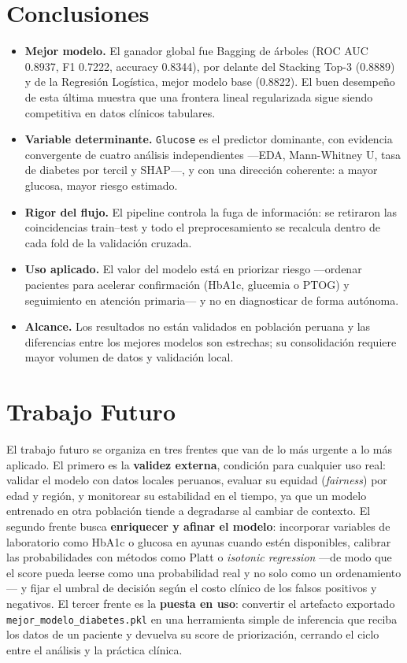 \documentclass[conference]{IEEEtran}
\newcommand{\code}[1]{\texttt{#1}}
\begin{document}
\section{Conclusiones}

\begin{itemize}[leftmargin=1.3em,itemsep=2pt]
  \item \textbf{Mejor modelo.} El ganador global fue Bagging de árboles (ROC AUC 0.8937, F1 0.7222, accuracy 0.8344), por delante del Stacking Top-3 (0.8889) y de la Regresión Logística, mejor modelo base (0.8822). El buen desempeño de esta última muestra que una frontera lineal regularizada sigue siendo competitiva en datos clínicos tabulares.
  \item \textbf{Variable determinante.} \code{Glucose} es el predictor dominante, con evidencia convergente de cuatro análisis independientes ---EDA, Mann-Whitney U, tasa de diabetes por tercil y SHAP---, y con una dirección coherente: a mayor glucosa, mayor riesgo estimado.
  \item \textbf{Rigor del flujo.} El pipeline controla la fuga de información: se retiraron las coincidencias train--test y todo el preprocesamiento se recalcula dentro de cada fold de la validación cruzada.
  \item \textbf{Uso aplicado.} El valor del modelo está en priorizar riesgo ---ordenar pacientes para acelerar confirmación (HbA1c, glucemia o PTOG) y seguimiento en atención primaria--- y no en diagnosticar de forma autónoma.
  \item \textbf{Alcance.} Los resultados no están validados en población peruana y las diferencias entre los mejores modelos son estrechas; su consolidación requiere mayor volumen de datos y validación local.
\end{itemize}

\section{Trabajo Futuro}

El trabajo futuro se organiza en tres frentes que van de lo más urgente a lo más aplicado. El primero es la \textbf{validez externa}, condición para cualquier uso real: validar el modelo con datos locales peruanos, evaluar su equidad (\emph{fairness}) por edad y región, y monitorear su estabilidad en el tiempo, ya que un modelo entrenado en otra población tiende a degradarse al cambiar de contexto. El segundo frente busca \textbf{enriquecer y afinar el modelo}: incorporar variables de laboratorio como HbA1c o glucosa en ayunas cuando estén disponibles, calibrar las probabilidades con métodos como Platt o \emph{isotonic regression} ---de modo que el score pueda leerse como una probabilidad real y no solo como un ordenamiento--- y fijar el umbral de decisión según el costo clínico de los falsos positivos y negativos. El tercer frente es la \textbf{puesta en uso}: convertir el artefacto exportado \code{mejor\_modelo\_diabetes.pkl} en una herramienta simple de inferencia que reciba los datos de un paciente y devuelva su score de priorización, cerrando el ciclo entre el análisis y la práctica clínica.
\end{document}

